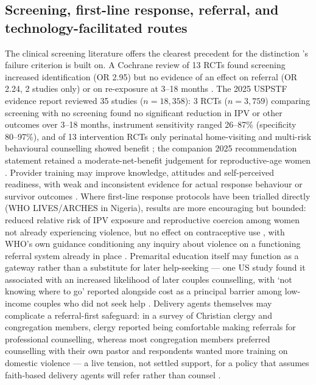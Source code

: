 \subsection{Screening, first-line response, referral, and technology-facilitated routes}
The clinical screening literature offers the clearest precedent for the distinction \tphe{}'s failure criterion is built on. A Cochrane review of 13 RCTs found screening increased identification (OR 2.95) but no evidence of an effect on referral (OR 2.24, 2 studies only) or on re-exposure at 3--18 months \cite{ref38}. The 2025 USPSTF evidence report reviewed 35 studies ($n=18{,}358$): 3 RCTs ($n=3{,}759$) comparing screening with no screening found no significant reduction in IPV or other outcomes over 3--18 months, instrument sensitivity ranged 26--87\% (specificity 80--97\%), and of 13 intervention RCTs only perinatal home-visiting and multi-risk behavioural counselling showed benefit \cite{ref39}; the companion 2025 recommendation statement retained a moderate-net-benefit judgement for reproductive-age women \cite{ref40}. Provider training may improve knowledge, attitudes and self-perceived readiness, with weak and inconsistent evidence for actual response behaviour or survivor outcomes \cite{ref41}. Where first-line response protocols have been trialled directly (WHO LIVES/ARCHES in Nigeria), results are more encouraging but bounded: reduced relative risk of IPV exposure and reproductive coercion among women not already experiencing violence, but no effect on contraceptive use \cite{ref42}, with WHO's own guidance conditioning any inquiry about violence on a functioning referral system already in place \cite{ref43,ref44}. Premarital education itself may function as a gateway rather than a substitute for later help-seeking --- one US study found it associated with an increased likelihood of later couples counselling, with `not knowing where to go' reported alongside cost as a principal barrier among low-income couples who did not seek help \cite{ref106,ref107}. Delivery agents themselves may complicate a referral-first safeguard: in a survey of Christian clergy and congregation members, clergy reported being comfortable making referrals for professional counselling, whereas most congregation members preferred counselling with their own pastor and respondents wanted more training on domestic violence --- a live tension, not settled support, for a policy that assumes faith-based delivery agents will refer rather than counsel \cite{ref118}.

